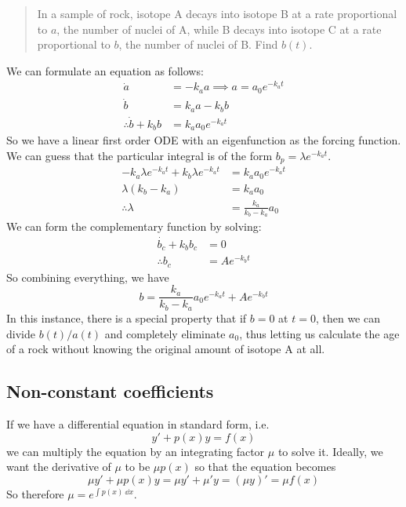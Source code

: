 \begin{quote}
	In a sample of rock, isotope A decays into isotope B at a rate proportional to \(a\), the number of nuclei of A, while B decays into isotope C at a rate proportional to \(b\), the number of nuclei of B.
	Find \(b(t)\).
\end{quote}

\noindent We can formulate an equation as follows:
\begin{align*}
	\dot a                    & = -k_a a \implies a = a_0 e^{-k_a t} \\
	\dot b                    & = k_a a - k_b b                      \\
	\therefore \dot b + k_b b & = k_a a_0 e^{-k_a t}
\end{align*}
\noindent So we have a linear first order ODE with an eigenfunction as the forcing function.
We can guess that the particular integral is of the form \(b_p = \lambda e^{-k_a t}\).
\begin{align*}
	-k_a\lambda e^{-k_a t} + k_b \lambda e^{-k_a t} & = k_a a_0 e^{-k_a t}        \\
	\lambda(k_b-k_a)                                & = k_a a_0                   \\
	\therefore \lambda                              & = \frac{k_a}{k_b - k_a} a_0
\end{align*}
We can form the complementary function by solving:
\begin{align*}
	\dot{b_c} + k_b b_c & = 0           \\
	\therefore b_c      & = Ae^{-k_b t}
\end{align*}
So combining everything, we have
\[
	b = \frac{k_a}{k_b - k_a} a_0 e^{-k_a t} + Ae^{-k_b t}
\]
In this instance, there is a special property that if \(b=0\) at \(t=0\), then we can divide \(b(t)/a(t)\) and completely eliminate \(a_0\), thus letting us calculate the age of a rock without knowing the original amount of isotope A at all.

\subsection{Non-constant coefficients}
If we have a differential equation in standard form, i.e.
\[
	y' + p(x)y = f(x)
\]
we can multiply the equation by an integrating factor \(\mu\) to solve it.
Ideally, we want the derivative of \(\mu\) to be \(\mu p(x)\) so that the equation becomes
\[
	\mu y' + \mu p(x) y = \mu y' + \mu' y = (\mu y)' = \mu f(x)
\]
So therefore \(\mu = e^{\int p(x)\ \dd{x}}\).
